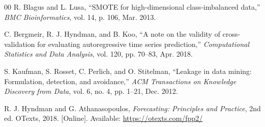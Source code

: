 \documentclass[conference]{IEEEtran}
\begin{document}
\begin{thebibliography}{00}
R. Blagus and L. Lusa, ``SMOTE for high-dimensional class-imbalanced data,''
\textit{BMC Bioinformatics}, vol. 14, p. 106, Mar. 2013.

C. Bergmeir, R. J. Hyndman, and B. Koo, ``A note on the validity of
cross-validation for evaluating autoregressive time series prediction,''
\textit{Computational Statistics and Data Analysis}, vol. 120, pp. 70--83,
Apr. 2018.

S. Kaufman, S. Rosset, C. Perlich, and O. Stitelman, ``Leakage in data
mining: Formulation, detection, and avoidance,'' \textit{ACM Transactions on
Knowledge Discovery from Data}, vol. 6, no. 4, pp. 1--21, Dec. 2012.

R. J. Hyndman and G. Athanasopoulos, \textit{Forecasting: Principles and
Practice}, 2nd ed. OTexts, 2018. [Online]. Available:
\url{https://otexts.com/fpp2/}

\end{thebibliography}
\end{document}
